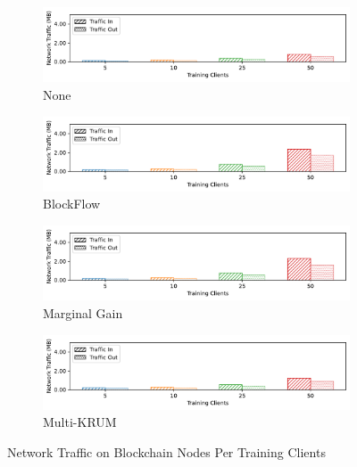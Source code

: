 \begin{figure}[!ht]
    \centering
    \begin{subfigure}[b]{0.49\textwidth}
        \centering
        \includegraphics[width=\textwidth]{graphics/clients/net_none_miner.pdf}
        \caption{None}
    \end{subfigure}
    \hfill
    \begin{subfigure}[b]{0.49\textwidth}
        \centering
        \includegraphics[width=\textwidth]{graphics/clients/net_blockflow_miner.pdf}
        \caption{BlockFlow}
    \end{subfigure}
    \hfill
    \begin{subfigure}[b]{0.49\textwidth}
        \centering
        \includegraphics[width=\textwidth]{graphics/clients/net_marginalgain_miner.pdf}
        \caption{Marginal Gain}
    \end{subfigure}
    \hfill
    \begin{subfigure}[b]{0.49\textwidth}
        \centering
        \includegraphics[width=\textwidth]{graphics/clients/net_multikrum_miner.pdf}
        \caption{Multi-KRUM}
    \end{subfigure}
    \caption{Network Traffic on Blockchain Nodes Per Training Clients}
    \label{fig:net_clients_degree_miner}
\end{figure}


